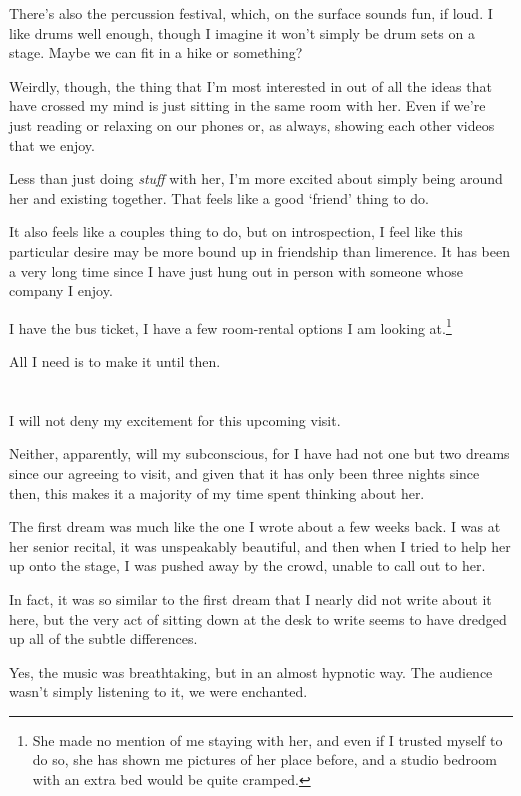 There's also the percussion festival, which, on the surface sounds fun, if loud. I like drums well enough, though I imagine it won't simply be drum sets on a stage. Maybe we can fit in a hike or something?

Weirdly, though, the thing that I'm most interested in out of all the ideas that have crossed my mind is just sitting in the same room with her. Even if we're just reading or relaxing on our phones or, as always, showing each other videos that we enjoy.

Less than just doing \emph{stuff} with her, I'm more excited about simply being around her and existing together. That feels like a good `friend' thing to do.

It also feels like a couples thing to do, but on introspection, I feel like this particular desire may be more bound up in friendship than limerence. It has been a very long time since I have just hung out in person with someone whose company I enjoy.

I have the bus ticket, I have a few room-rental options I am looking at.\footnote{She made no mention of me staying with her, and even if I trusted myself to do so, she has shown me pictures of her place before, and a studio bedroom with an extra bed would be quite cramped.}

All I need is to make it until then.

\section{}

I will not deny my excitement for this upcoming visit.

Neither, apparently, will my subconscious, for I have had not one but two dreams since our agreeing to visit, and given that it has only been three nights since then, this makes it a majority of my time spent thinking about her.

The first dream was much like the one I wrote about a few weeks back. I was at her senior recital, it was unspeakably beautiful, and then when I tried to help her up onto the stage, I was pushed away by the crowd, unable to call out to her.

In fact, it was so similar to the first dream that I nearly did not write about it here, but the very act of sitting down at the desk to write seems to have dredged up all of the subtle differences.

Yes, the music was breathtaking, but in an almost hypnotic way. The audience wasn't simply listening to it, we were enchanted.

